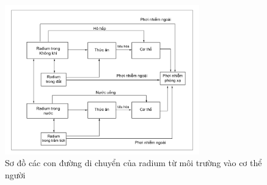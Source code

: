    \begin{figure}[htbp]
    \centering
    \includegraphics[width=0.75\textwidth]{Image/RadiumInHuman.png}
    \caption{Sơ đồ các con đường di chuyển của radium từ môi trường vào cơ thể người ~\cite{IAEANo476:revise}}
    \label{figure:RadiumToHuman}
\end{figure}
      
\clearpage



